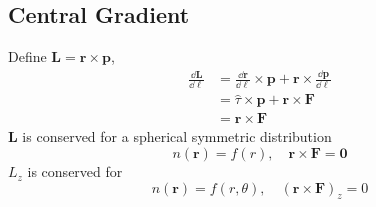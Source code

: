 \documentclass[12pt]{article}
\begin{document}
\subsection{Central Gradient}
Define $\bm L=\bm r\times \bm p$,
\begin{align}
	\frac{\dd \bm L}{\dd \ell}&=\frac{\dd\bm r}{\dd \ell}\times\bm p+\bm r\times\frac{\dd\bm p}{\dd \ell}
	\\&=\hat{\tau}\times \bm p+\bm r\times\bm F
	\\&=\bm r\times\bm F
\end{align}
$\bm L$ is conserved for a spherical symmetric distribution
\begin{equation}
n(\bm r)=f(r),\quad \bm r\times\bm F=\bm 0
\end{equation}
$L_z$ is conserved for 
\begin{equation}
n(\bm r)=f(r,\theta),\quad (\bm r\times\bm F)_z=0
\end{equation}
\end{document}
